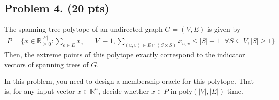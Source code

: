 \documentclass[12pt]{article}
\theoremstyle{plain}
\theoremstyle{definition}
\begin{document}
 \newline
\   %
\newpage
\subsection*{Problem 4. (20 pts)}
The spanning tree polytope of an undirected graph $G = (V,E)$ is given by
\begin{align*}
    P=\{x\in \mathbb{R}_{\geq 0}^{|E|}:\sum_{e\in E}x_e=|V|-1, \sum_{(u,v)\in E\cap (S\times S)}x_{u,v}\leq |S|-1~~~\forall S\subseteq V,|S|\geq 1\}
\end{align*}
Then, the extreme points of this polytope exactly correspond to the indicator vectors of spanning
trees of $G$. 

In this problem, you need to design a membership oracle for this polytope. That is, for any input vector $x\in \mathbb{R}^n$, decide whether $x\in P$ in $\mathrm{poly}(|V|,|E|)$ time.

 \newline
\   %
\newpage
\end{document}
